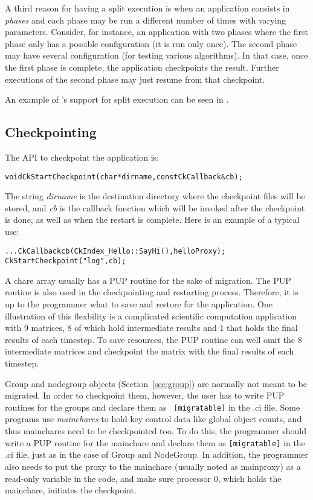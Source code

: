 A third reason for having a split execution is when an application
consists in \emph{phases} and each phase may be run a different number
of times with varying parameters. Consider, for instance, an
application with two phases where the first phase only has a possible
configuration (it is run only once). The second phase may have several
configuration (for testing various algorithms). In that case, once the
first phase is complete, the application checkpoints the
result. Further executions of the second phase may just resume from
that checkpoint.

An example of \charmpp{}'s support for split execution can be seen
in .

\subsection{Checkpointing}

\label{sec:diskcheckpoint}
	The API to checkpoint the application is:

\begin{alltt} 
  void CkStartCheckpoint(char* dirname,const CkCallback& cb);
\end{alltt}

The string {\it dirname} is the destination directory where the
checkpoint files will be stored, and {\it cb} is the callback function
which will be invoked after the checkpoint is done, as well as when
the restart is complete. Here is an example of a typical use:

\begin{alltt} 
  . . .  CkCallback cb(CkIndex_Hello::SayHi(),helloProxy);
  CkStartCheckpoint("log",cb);
\end{alltt}

A chare array usually has a PUP routine for the sake of migration.
The PUP routine is also used in the checkpointing and restarting
process.  Therefore, it is up to the programmer what to save and
restore for the application. One illustration of this flexbility is a
complicated scientific computation application with 9 matrices, 8 of
which hold intermediate results and 1 that holds the final results
of each timestep.  To save resources, the PUP routine can well omit
the 8 intermediate matrices and checkpoint the matrix with the final
results of each timestep.

Group and nodegroup objects (Section~\ref{sec:group}) are normally not
meant to be migrated. In order to checkpoint them, however, the user
has to write PUP routines for the groups and declare them as {\tt
[migratable]} in the .ci file. Some programs use {\it mainchares} to
hold key control data like global object counts, and thus mainchares
need to be checkpointed too. To do this, the programmer should write a
PUP routine for the mainchare and declare them as {\tt [migratable]}
in the .ci file, just as in the case of Group and NodeGroup. In
addition, the programmer also needs to put the proxy to the mainchare
(usually noted as mainproxy) as a read-only variable in the code, and make
sure processor 0, which holds the mainchare, initiates the checkpoint.

